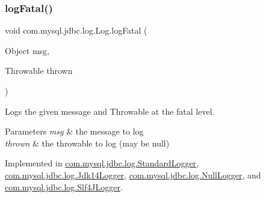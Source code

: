 \mbox{\label{interfacecom_1_1mysql_1_1jdbc_1_1log_1_1_log_a6da5bf2be5d9c63cfd192ab457aaff92}} 
\subsubsection{\texorpdfstring{log\+Fatal()}{logFatal()}\hspace{0.1cm}{\footnotesize\ttfamily [2/2]}}
{\footnotesize\ttfamily void com.\+mysql.\+jdbc.\+log.\+Log.\+log\+Fatal (\begin{DoxyParamCaption}\item[{Object}]{msg,  }\item[{Throwable}]{thrown }\end{DoxyParamCaption})}

Logs the given message and Throwable at the \textquotesingle{}fatal\textquotesingle{} level.


\begin{DoxyParams}{Parameters}
{\em msg} & the message to log \\
\hline
{\em thrown} & the throwable to log (may be null) \\
\hline
\end{DoxyParams}


Implemented in \mbox{\hyperlink{classcom_1_1mysql_1_1jdbc_1_1log_1_1_standard_logger_a4e5b84fe2f897f169521ae8b712c5626}{com.\+mysql.\+jdbc.\+log.\+Standard\+Logger}}, \mbox{\hyperlink{classcom_1_1mysql_1_1jdbc_1_1log_1_1_jdk14_logger_adc559d153307c03a7d032eed1fbc092d}{com.\+mysql.\+jdbc.\+log.\+Jdk14\+Logger}}, \mbox{\hyperlink{classcom_1_1mysql_1_1jdbc_1_1log_1_1_null_logger_aefb06f46d91ee385eb925ef2659f591c}{com.\+mysql.\+jdbc.\+log.\+Null\+Logger}}, and \mbox{\hyperlink{classcom_1_1mysql_1_1jdbc_1_1log_1_1_slf4_j_logger_a10bac00b095b12a28fbd9e988e50504e}{com.\+mysql.\+jdbc.\+log.\+Slf4\+J\+Logger}}.

\mbox{\label{interfacecom_1_1mysql_1_1jdbc_1_1log_1_1_log_a6a380b7638c3ebe1251d4e07cb7f4569}} 
